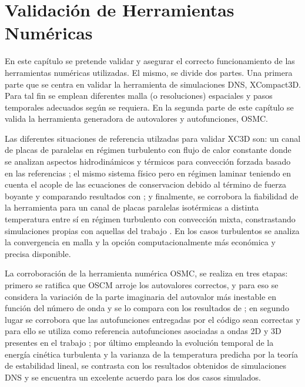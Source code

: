 \chapter{Validación de Herramientas Numéricas} \label{cap:validacion}


En este capítulo se pretende validar y asegurar el correcto funcionamiento de las herramientas numéricas utilizadas. El mismo, se divide dos partes. Una primera parte que se centra en validar la herramienta de simulaciones DNS, XCompact3D. Para tal fin se emplean diferentes malla (o resoluciones) espaciales y pasos temporales adecuados según se requiera. En la segunda parte de este capítulo se valida la herramienta generadora de autovalores y autofunciones, OSMC.

Las diferentes situaciones de referencia utilzadas para validar XC3D son: un canal de placas de paralelas en régimen turbulento con flujo de calor constante donde se analizan aspectos hidrodinámicos y térmicos para convección forzada basado en las referencias \cite{moser1999, kawamura2000dns}; el mismo sistema físico pero en régimen laminar teniendo en cuenta el acople de las ecuaciones de conservacion debido al término de fuerza boyante y comparando resultados con \cite{chen1996linear}; y finalmente, se corrobora la fiabilidad de la herramienta para un canal de placas paralelas isotérmicas a distinta temperatura entre sí en régimen  turbulento con convección mixta, constrastando simulaciones propias con aquellas del trabajo \cite{guo2022direct}. En los casos turbulentos se analiza la convergencia en malla y la opción computacionalmente más económica y precisa disponible. %

La corroboración de la herramienta numérica OSMC, se realiza en tres etapas: primero se ratifica que OSCM arroje los autovalores correctos, y para eso se considera la variación de la parte imaginaria del autovalor más inestable en función del número de onda y se lo compara con los resultados de \cite{chen1996linear}; en segundo lugar se corrobora que las autofunciones entregadas por el código sean correctas y para ello se utiliza como referencia autofunciones asociadas a ondas 2D y 3D presentes en el trabajo \cite{chen2003direct}; por último empleando la evolución temporal de la energía cinética turbulenta y la varianza de la temperatura predicha por la teoría de estabilidad lineal, se contrasta con los resultados obtenidos de simulaciones DNS y se encuentra un excelente acuerdo para los dos casos simulados.

